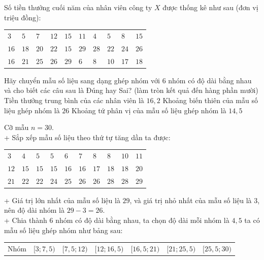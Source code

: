 \begin{ex}%
	Số tiền thưởng cuối năm của nhân viên công ty $X$ được thống kê như sau (đơn vị triệu đồng):
	\begin{center}
		\begin{tabular}{llllllllll}
			$3$ & $5$ & $7$ & $12$ & $15$ & $11$ & $4$ & $5$ & $8$ & $15$ \\
			$16$ & $18$ & $20$ & $22$ & $15$ & $29$ & $28$ & $22$ & $24$ & $26 $\\
			$16$ & $21$ & $25$ & $26$ & $29$ & $6$ & $8$ & $10$ & $17$ & $18$
		\end{tabular}
	\end{center}
	\choiceTF
	{Hãy chuyển mẫu số liệu sang dạng ghép nhóm với 6 nhóm có độ dài bằng nhau và cho biết các câu sau là Đúng hay Sai? (làm tròn kết quả đến hàng phần mười)}
	{\True Tiền thưởng trung bình của các nhân viên là $16{,}2$}
	{Khoảng biến thiên của mẫu số liệu ghép nhóm là $26$}
	{Khoảng tứ phân vị của mẫu số liệu ghép nhóm là $ 14{,}5$}
	\loigiai
	{
		\begin{itemchoice}
			\itemch Cỡ mẫu $n=30$.\\
			+ Sắp xếp mẫu số liệu theo thứ tự tăng dần ta được:
			\begin{center}
				\begin{tabular}{llllllllll}
					$3$ & $4$ & $5$ & $5$ & $6$ & $7$ & $8$ & $8$ & $10$ & $11$ \\
					$12$ & $15$ & $15$ & $15$ & $16$ & $16$ & $17$ & $18$ & $18$ & $20$ \\
					$21$ & $22$ & $22$ & $24$ & $25$ & $26$ & $26$ & $28$ & $28$ & $29$
				\end{tabular}
			\end{center}
			+ Giá trị lớn nhất của mẫu số liệu là $29$, và giá trị nhỏ nhất của mẫu số liệu là $3 $, nên độ dài nhóm là $29-3=26$.\\
			+ Chia thành $6$ nhóm có độ dài bằng nhau, ta chọn độ dài mỗi nhóm là $4{,}5 $ ta có mẫu số liệu ghép nhóm như bảng sau:
			\begin{center}
				\begin{tabular}{|c|c|c|c|c|c|c|}
					\hline Nhóm & {$[3 ; 7{,}5)$} & {$[7{,}5 ; 12)$} & {$[12 ; 16{,}5)$} & {$[16{,}5 ; 21)$} & {$[21 ; 25{,}5)$} & {$[25{,}5 ; 30)$} \\

\end{tabular}
\end{center}
\end{itemchoice}}
\end{ex}

